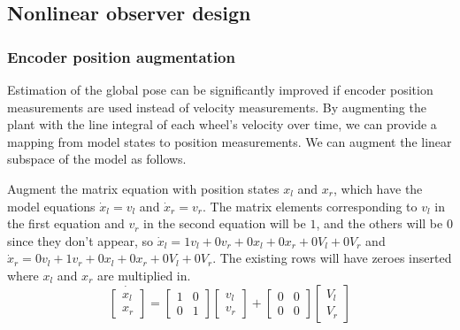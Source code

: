 \subsection{Nonlinear observer design}

\subsubsection{Encoder position augmentation}

Estimation of the global pose can be significantly improved if encoder position
measurements are used instead of velocity measurements. By augmenting the plant
with the line integral of each wheel's velocity over time, we can provide a
mapping from model states to position measurements. We can augment the linear
subspace of the model as follows.

Augment the matrix equation with position states $x_l$ and $x_r$, which have the
model equations $\dot{x}_l = v_l$ and $\dot{x}_r = v_r$. The matrix elements
corresponding to $v_l$ in the first equation and $v_r$ in the second equation
will be $1$, and the others will be $0$ since they don't appear, so
$\dot{x}_l = 1v_l + 0v_r + 0x_l + 0x_r + 0V_l + 0V_r$ and
$\dot{x}_r = 0v_l + 1v_r + 0x_l + 0x_r + 0V_l + 0V_r$. The existing rows will
have zeroes inserted where $x_l$ and $x_r$ are multiplied in.
\begin{equation*}
  \dot{\begin{bmatrix}
    x_l \\
    x_r
  \end{bmatrix}} =
  \begin{bmatrix}
    1 & 0 \\
    0 & 1
  \end{bmatrix}
  \begin{bmatrix}
    v_l \\
    v_r
  \end{bmatrix} +
  \begin{bmatrix}
    0 & 0 \\
    0 & 0
  \end{bmatrix}
  \begin{bmatrix}
    V_l \\
    V_r
  \end{bmatrix}
\end{equation*}


